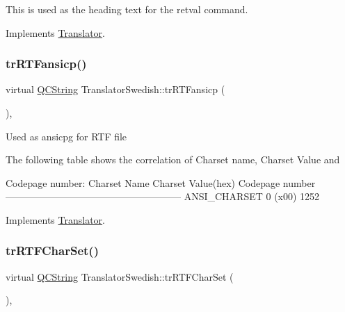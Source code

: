 This is used as the heading text for the retval command. 

Implements \mbox{\hyperlink{class_translator}{Translator}}.

\mbox{\label{class_translator_swedish_aebe430c7fda5411e06f1f22f417fb961}} 
\subsubsection{\texorpdfstring{trRTFansicp()}{trRTFansicp()}}
{\footnotesize\ttfamily virtual \mbox{\hyperlink{class_q_c_string}{Q\+C\+String}} Translator\+Swedish\+::tr\+R\+T\+Fansicp (\begin{DoxyParamCaption}{ }\end{DoxyParamCaption})\hspace{0.3cm}{\ttfamily [inline]}, {\ttfamily [virtual]}}

Used as ansicpg for R\+TF file

The following table shows the correlation of Charset name, Charset Value and 
\begin{DoxyPre}
Codepage number:
Charset Name       Charset Value(hex)  Codepage number
------------------------------------------------------
ANSI\_CHARSET              0 (x00)            1252
\end{DoxyPre}
 

Implements \mbox{\hyperlink{class_translator_a9953a4c0e6a4fc7d017abcd5c2939e0f}{Translator}}.

\mbox{\label{class_translator_swedish_a15d3828ee6fc655c47861158c0aca7cb}} 
\subsubsection{\texorpdfstring{trRTFCharSet()}{trRTFCharSet()}}
{\footnotesize\ttfamily virtual \mbox{\hyperlink{class_q_c_string}{Q\+C\+String}} Translator\+Swedish\+::tr\+R\+T\+F\+Char\+Set (\begin{DoxyParamCaption}{ }\end{DoxyParamCaption})\hspace{0.3cm}{\ttfamily [inline]}, {\ttfamily [virtual]}}

